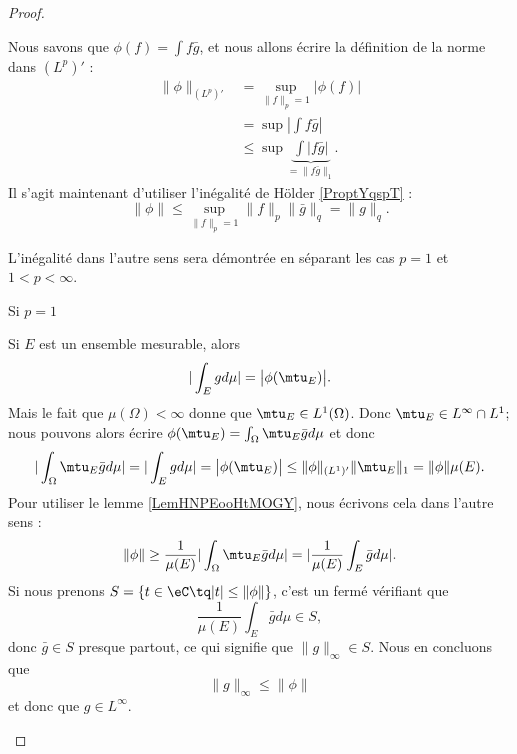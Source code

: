 \begin{proof}
\begin{subproof}
            Nous savons que \( \phi(f)=\int f\bar g\), et nous allons écrire la définition de la norme dans \( (L^p)'\) :
            \begin{subequations}
                \begin{align}
                    \| \phi \|_{(L^p)'}&=\sup_{\| f \|_p=1}\big| \phi(f) \big|\\
                    &=\sup| \int f\bar g |\\
                    &\leq\sup\underbrace{\int| f\bar g |}_{=\| f\bar g \|_1}.
                \end{align}
            \end{subequations}
            Il s'agit maintenant d'utiliser l'inégalité de Hölder \ref{ProptYqspT} :
            \begin{equation}
                \| \phi \|\leq \sup_{\| f \|_p=1}\| f \|_p\| \bar g \|_q=\| g \|_q.
            \end{equation}

            L'inégalité dans l'autre sens sera démontrée en séparant les cas \( p=1\) et \( 1<p<\infty\).

        \item[Si \( p=1\)]

            Si \( E\) est un ensemble mesurable, alors
            \begin{equation}
                | \int_Egd\mu |=\big| \phi(\mtu_E) \big|.
            \end{equation}
            Mais le fait que \( \mu(\Omega)<\infty\) donne que \( \mtu_E\in L^1(\Omega)\). Donc \( \mtu_E\in L^{\infty}\cap L^1\); nous pouvons alors écrire \( \phi(\mtu_E)=\int_{\Omega}\mtu_E\bar gd\mu\) et donc
            \begin{equation}    \label{EqUPCTooJvoKKI}
                | \int_{\Omega}\mtu_E\bar gd\mu |=|\int_Egd\mu |=\big| \phi(\mtu_E) \big|\leq \| \phi \|_{(L^1)'}\| \mtu_E \|_1=\| \phi \|\mu(E).
            \end{equation}
            Pour utiliser le lemme \ref{LemHNPEooHtMOGY}, nous écrivons cela dans l'autre sens :
            \begin{equation}
                \| \phi \|\geq \frac{1}{ \mu(E) }| \int_{\Omega}\mtu_E\bar gd\mu |=| \frac{1}{ \mu(E) }\int_E\bar gd\mu |.
            \end{equation}
            Si nous prenons \( S=\{ t\in \eC\tq | t |\leq \| \phi \| \}\), c'est un fermé vérifiant que
            \begin{equation}
                \frac{1}{ \mu(E) }\int_E\bar gd\mu\in S,
            \end{equation}
            donc \( \bar g\in S\) presque partout, ce qui signifie que \( \| g \|_{\infty}\in S\). Nous en concluons que
            \begin{equation}
                \| g \|_{\infty}\leq \| \phi \|
            \end{equation}
            et donc que \( g\in L^{\infty}\).


\end{subproof}
\end{proof}

